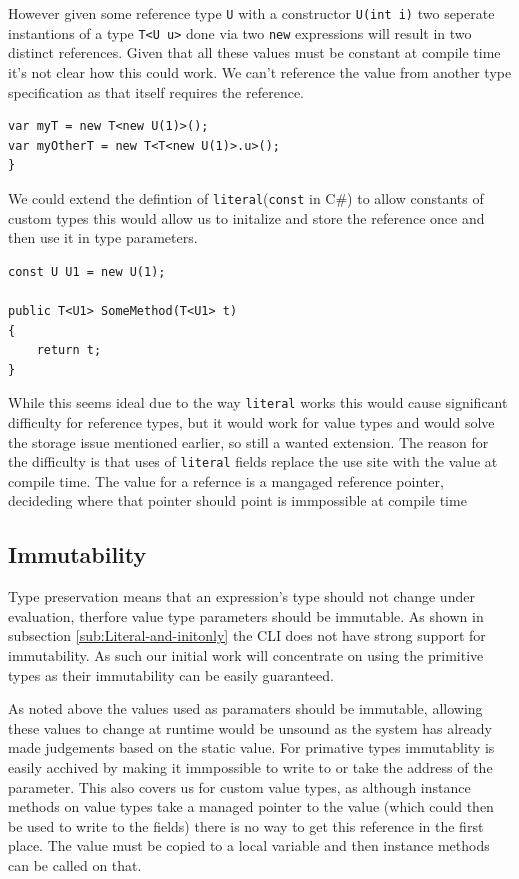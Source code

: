 \documentclass[english]{report}
\begin{document}
However given some reference type \texttt{U} with a constructor \texttt{U(int i)} two seperate instantions of 
a type \texttt{T<U u>} done via two \texttt{new} expressions will result in two distinct references. 
Given that all these values must be constant at compile time it's not clear how this could work. We can't 
reference the value from another type specification as that itself requires the reference.

\begin{lstlisting}[caption={An issue with refernce values},keywordstyle={\color{blue}},language=sharpc]
var myT = new T<new U(1)>();
var myOtherT = new T<T<new U(1)>.u>();
}
\end{lstlisting}

We could extend the defintion of \texttt{literal}(\texttt{const} in C\#) to allow constants of custom types this would allow us to 
initalize and store the reference once and then use it in type parameters.

\begin{lstlisting}[caption={Literal refernces},keywordstyle={\color{blue}},language=sharpc]
const U U1 = new U(1);

public T<U1> SomeMethod(T<U1> t)
{
	return t;
}
\end{lstlisting}

While this seems ideal due to the way \texttt{literal} works this would cause significant difficulty for reference types,
but it would work for value types and would solve the storage issue mentioned earlier, so still a wanted extension.
The reason for the difficulty is that uses of \texttt{literal} fields replace the use site with the value at compile time. 
The value for a refernce is a mangaged reference pointer, decideding where that pointer should point is immpossible at compile time

\subsection{Immutability}

Type preservation means that an expression's type should not change
under evaluation, therfore value type parameters should be immutable.
As shown in subsection \ref{sub:Literal-and-initonly} the CLI does
not have strong support for immutability. As such our initial work
will concentrate on using the primitive types as their immutability
can be easily guaranteed.

As noted above the values used as paramaters should be immutable, allowing these values to change at runtime would be unsound 
as the system has already made judgements based on the static value. For primative types immutablity is easily acchived by making 
it immpossible to write to or take the address of the parameter. This also covers us for custom value types, as although instance 
methods on value types take a managed pointer to the value (which could then be used to write to the fields) there is no way to
get this reference in the first place. The value must be copied to a local variable and then instance methods can be called on that.
\end{document}
